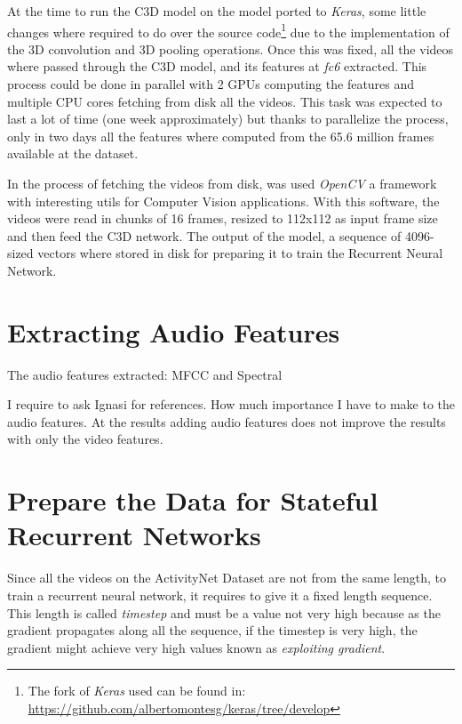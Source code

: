 At the time to run the C3D model on the model ported to \textit{Keras}, some little changes where required to do over the source code\footnote{The fork of \textit{Keras} used can be found in: \url{https://github.com/albertomontesg/keras/tree/develop}} due to the implementation of the 3D convolution and 3D pooling operations. Once this was fixed, all the videos where passed through the C3D model, and its features at \textit{fc6} extracted. This process could be done in parallel with 2 GPUs computing the features and multiple CPU cores fetching from disk all the videos. This task was expected to last a lot of time (one week approximately) but thanks to parallelize the process, only in two days all the features where computed from the 65.6 million frames available at the dataset.

In the process of fetching the videos from disk, was used \textit{OpenCV}\cite{opencv_library} a framework with interesting utils for Computer Vision applications. With this software, the videos were read in chunks of 16 frames, resized to 112x112 as input frame size and then feed the C3D network. The output of the model, a sequence of 4096-sized vectors where stored in disk for preparing it to train the Recurrent Neural Network.

\section{Extracting Audio Features}

The audio features extracted: MFCC and Spectral

I require to ask Ignasi for references. How much importance I have to make to the audio features. At the results adding audio features does not improve the results with only the video features.


\section{Prepare the Data for Stateful Recurrent Networks}

Since all the videos on the ActivityNet Dataset are not from the same length, to train a recurrent neural network, it requires to give it a fixed length sequence. This length is called \textit{timestep} and must be a value not very high because as the gradient propagates along all the sequence, if the timestep is very high, the gradient might achieve very high values known as \textit{exploiting gradient}.

